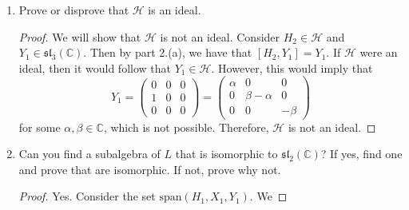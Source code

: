 \documentclass[12pt]{article}
\theoremstyle{definition}
\begin{document}
\begin{enumerate}
\begin{enumerate}[label=(\alph*)]
\begin{proof}
\begin{equation*}
\begin{split}
                                H_2] \\
                                &=(\alpha\gamma)(0)-(\alpha\delta)(0)
                                +(\beta\gamma)(0)+(\beta\delta)(0) \\
                                &=0\in\mathcal{H}.
                            \end{split}
                        \end{equation*}
                        The final line both completes the prove that
                        $\mathcal{H}$ is a subalgebra and it also proves that
                        $\mathcal{H}$ is abelian.
                    \end{proof}
                \item Prove or disprove that $\mathcal{H}$ is an ideal.
                    \begin{proof}
                        We will show that $\mathcal{H}$ is not an ideal.
                        Consider $H_2\in\mathcal{H}$ and
                        $Y_1\in\mathfrak{sl}_3(\mathbb{C})$. Then by part
                        2.(a), we have that $[H_2, Y_1]=Y_1$. If $\mathcal{H}$
                        were an ideal, then it would follow that
                        $Y_1\in\mathcal{H}$. However, this would imply that 
                        \begin{equation*}
                            Y_1=\begin{pmatrix}0&0&0\\1&0&0\\0&0&0\end{pmatrix}
                            =\begin{pmatrix}\alpha&0&0\\0&\beta-\alpha&0\\0&0&-\beta\end{pmatrix}  
                        \end{equation*}
                        for some $\alpha, \beta\in \mathbb{C}$, which is not
                        possible. Therefore, $\mathcal{H}$ is not an ideal.
                    \end{proof}
                \item Can you find a subalgebra of $L$ that is isomorphic to
                    $\mathfrak{sl}_2(\mathbb{C})$? If yes, find one and prove
                    that are isomorphic. If not, prove why not.
                    \begin{proof}
                        Yes. Consider the set $\text{span}(H_1, X_1, Y_1)$. We

\end{proof}
\end{enumerate}
\end{enumerate}
\end{document}
